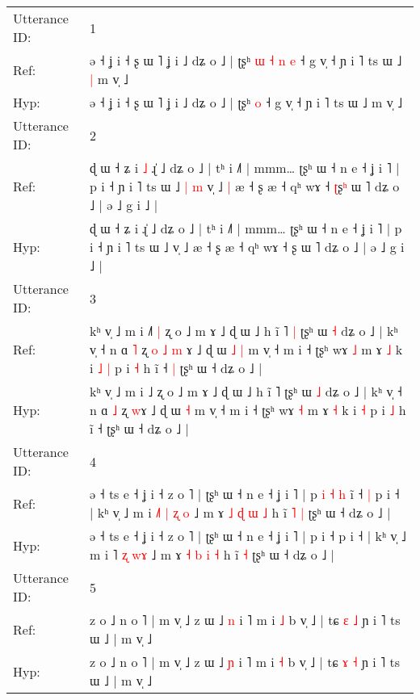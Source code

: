 \documentclass[10pt]{article}
\DeclareRobustCommand{\hl}[1]{{\textcolor{red}{#1}}}
\begin{document}
\begin{longtable}{ll}
\toprule
Utterance ID: & 1 \\
Ref: & ə ˧ ʝ i ˧ ʂ ɯ ˥ ʝ i ˩ dʑ o ˩ | ʈʂʰ\hl{ }\hl{ɯ}\hl{ }\hl{˧}\hl{ }\hl{n} \hl{e} ˧ g v̩ ˧ ɲ i ˥ ts ɯ ˩\hl{ }\hl{|} m v̩ ˩
 \\
Hyp: & ə ˧ ʝ i ˧ ʂ ɯ ˥ ʝ i ˩ dʑ o ˩ | ʈʂʰ\hl{}\hl{}\hl{}\hl{}\hl{}\hl{} \hl{o} ˧ g v̩ ˧ ɲ i ˥ ts ɯ ˩\hl{}\hl{} m v̩ ˩
 \\
\midrule
Utterance ID: & 2 \\
Ref: & ɖ ɯ ˧ ʑ i\hl{ }\hl{˩} ɻ̍ ˩ dʑ o ˩ | tʰ i ˩˥ | mmm… ʈʂʰ ɯ ˧ n e ˧ ʝ i ˥ | p i ˧ ɲ i ˥ ts ɯ ˩\hl{ }\hl{|}\hl{ }\hl{m} v̩ ˩\hl{ }\hl{|} æ ˧ ʂ æ ˧ qʰ wɤ ˧ \hl{ʈ}ʂ\hl{ʰ} ɯ ˥ dʑ o ˩ | ə ˩ g i ˩ |
 \\
Hyp: & ɖ ɯ ˧ ʑ i\hl{}\hl{} ɻ̍ ˩ dʑ o ˩ | tʰ i ˩˥ | mmm… ʈʂʰ ɯ ˧ n e ˧ ʝ i ˥ | p i ˧ ɲ i ˥ ts ɯ ˩\hl{}\hl{}\hl{}\hl{} v̩ ˩\hl{}\hl{} æ ˧ ʂ æ ˧ qʰ wɤ ˧ \hl{}ʂ\hl{} ɯ ˥ dʑ o ˩ | ə ˩ g i ˩ |
 \\
\midrule
Utterance ID: & 3 \\
Ref: & kʰ v̩ ˩ m i ˩\hl{˥}\hl{ }\hl{|} ʐ o ˩ m ɤ ˩ ɖ ɯ ˩ h ĩ ˥\hl{ }\hl{|} ʈʂʰ ɯ \hl{˧} dʑ o ˩ | kʰ v̩ ˧ n ɑ \hl{˥} ʐ\hl{ }\hl{o}\hl{ }\hl{˩} \hl{m}\hl{ }ɤ ˩ ɖ ɯ\hl{ }\hl{˩} \hl{|} m v̩ ˧ m i ˧ ʈʂʰ wɤ \hl{˩} m ɤ \hl{˩} k i\hl{ }\hl{˩} \hl{|} p i \hl{˧} h ĩ ˧\hl{ }\hl{|} ʈʂʰ ɯ ˧ dʑ o ˩ |
 \\
Hyp: & kʰ v̩ ˩ m i ˩\hl{}\hl{}\hl{} ʐ o ˩ m ɤ ˩ ɖ ɯ ˩ h ĩ ˥\hl{}\hl{} ʈʂʰ ɯ \hl{˩} dʑ o ˩ | kʰ v̩ ˧ n ɑ \hl{˩} ʐ\hl{}\hl{}\hl{}\hl{} \hl{}\hl{w}ɤ ˩ ɖ ɯ\hl{}\hl{} \hl{˧} m v̩ ˧ m i ˧ ʈʂʰ wɤ \hl{˧} m ɤ \hl{˧} k i\hl{}\hl{} \hl{˧} p i \hl{˩} h ĩ ˧\hl{}\hl{} ʈʂʰ ɯ ˧ dʑ o ˩ |
 \\
\midrule
Utterance ID: & 4 \\
Ref: & ə ˧ ts e ˧ ʝ i ˧ z o ˥ | ʈʂʰ ɯ ˧ n e ˧ ʝ i ˥ | p\hl{ }\hl{i}\hl{ }\hl{˧}\hl{ }\hl{h} i\hl{̃} ˧\hl{ }\hl{|} p i ˧ | kʰ v̩ ˩ m i \hl{˩}˥ \hl{|} \hl{ʐ}\hl{ }\hl{o} ˩ m ɤ \hl{˩} \hl{ɖ} \hl{ɯ} \hl{˩} h ĩ\hl{ }\hl{˥} \hl{|} ʈʂʰ ɯ ˧ dʑ o ˩ |
 \\
Hyp: & ə ˧ ts e ˧ ʝ i ˧ z o ˥ | ʈʂʰ ɯ ˧ n e ˧ ʝ i ˥ | p\hl{}\hl{}\hl{}\hl{}\hl{}\hl{} i\hl{} ˧\hl{}\hl{} p i ˧ | kʰ v̩ ˩ m i \hl{}˥ \hl{ʐ} \hl{}\hl{w}\hl{ɤ} ˩ m ɤ \hl{˧} \hl{b} \hl{i} \hl{˧} h ĩ\hl{}\hl{} \hl{˧} ʈʂʰ ɯ ˧ dʑ o ˩ |
 \\
\midrule
Utterance ID: & 5 \\
Ref: & z o ˩ n o ˥ | m v̩ ˩ z ɯ ˩ \hl{n} i ˥ m i \hl{˩} b v̩ ˩ | tɕ \hl{ɛ} \hl{˩} ɲ i ˥ ts ɯ ˩ | m v̩ ˩
 \\
Hyp: & z o ˩ n o ˥ | m v̩ ˩ z ɯ ˩ \hl{ɲ} i ˥ m i \hl{˧} b v̩ ˩ | tɕ \hl{ɤ} \hl{˧} ɲ i ˥ ts ɯ ˩ | m v̩ ˩

\end{longtable}
\end{document}
